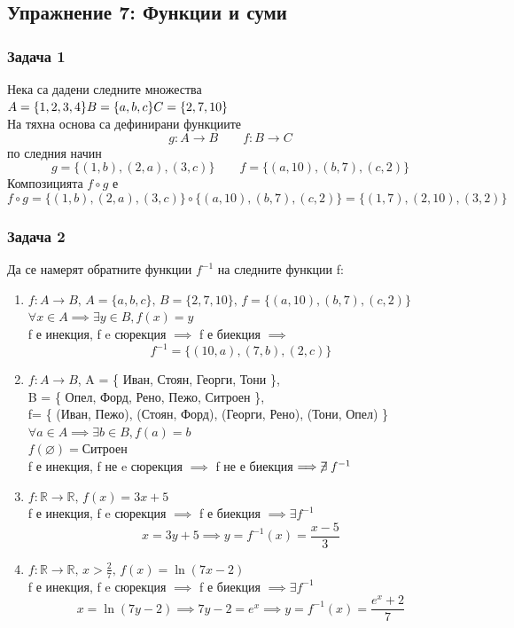\documentclass[fleqn, 12pt]{article}
\theoremstyle{definition}
\begin{document}
\newpage
\subsection{Упражнение 7: Функции и суми}

\subsubsection*{Задача 1}
Нека са дадени следните множества \\
$
A = \{1, 2, 3, 4\} \\
B = \{ a, b, c\} \\
C = \{2, 7, 10 \}
$\\
На тяхна основа са дефинирани функциите \\
$$g: A \to B \qquad f: B \to C$$
по следния начин
$$g = \{ (1, b), (2, a), (3, c) \} \qquad f = \{ (a, 10), (b, 7), (c, 2) \}$$
Композицията $f \circ g$ е \\
$$ f \circ g = \{ (1, b), (2, a), (3, c) \} \circ  \{ (a, 10), (b, 7), (c, 2) \} = \{ (1, 7), (2, 10), (3, 2) \}$$

\subsubsection*{Задача 2}
Да се намерят обратните функции $f^{-1}$ на следните функции f:
\begin{enumerate}
\item $f: A \to B, \, A = \{ a, b, c \}, \, B = \{2, 7, 10 \}, \, f = \{ (a, 10), (b, 7), (c, 2) \}$
$\forall x \in A \implies \exists y \in B, f(x) = y$\\
f е инекция, f e сюрекция $\implies$ f е биекция $\implies$
$$f^{-1} = \{ (10, a), (7, b), (2, c) \}$$
\item $f: A \to B$, A = \{ Иван, Стоян, Георги, Тони \}, \\
B = \{ Опел, Форд, Рено, Пежо, Ситроен \},\\ 
f= \{ (Иван, Пежо), (Стоян, Форд), (Георги, Рено), (Тони, Опел) \} \\
$\forall a \in A \implies \exists b \in B, f(a) = b$ \\
$f(\varnothing) = \text{Ситроен}$\\
f е инекция, f не e сюрекция $\implies $ f не е биекция$\implies \centernot\exists f^{-1}$ 
\item $f: \mathbb{R} \to \mathbb{R}, \, f(x) = 3x + 5$ \\
f е инекция, f e сюрекция $\implies$ f е биекция $\implies \exists f^{-1}$
$$x = 3y + 5 \implies y = f^{-1}(x) = \frac{x-5}{3} $$
\item $f: \mathbb{R} \to \mathbb{R}, \, x > \frac{2}{7}, \, f(x) = \ln{(7x-2)}$\\
f е инекция, f e сюрекция $\implies$ f е биекция $\implies \exists f^{-1}$
$$x = \ln{(7y-2)} \implies 7y - 2 = e^x \implies y = f^{-1}(x) = \frac{e^x + 2}{7}$$
\end{enumerate}
\end{document}
